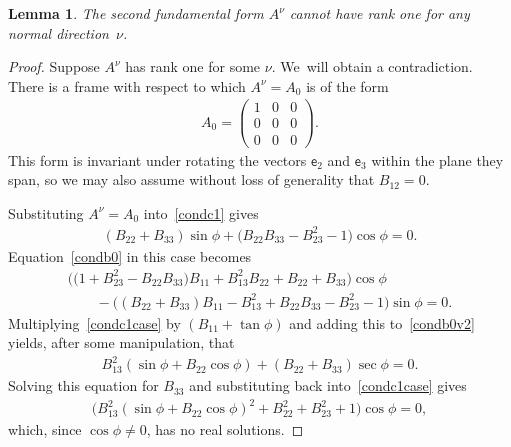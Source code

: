 \documentclass[10pt,a4paper]{amsart}
\def\ve{\mathsf{e}}
\newtheorem{Lemma}[Theorem]{Lemma}
\numberwithin{equation}{section}
\begin{document}
\begin{Lemma} \label{no-rank-one}
The second fundamental form $A^{\nu}$ cannot have rank one for any normal direc\-tion~$\nu$.
\end{Lemma}
\begin{proof}
Suppose $A^{\nu}$ has rank one for some $\nu$. We~will obtain a contradiction. There is a frame with respect to which $A^{\nu} = A_0$ is of the form
\begin{gather*}
A_0 = \begin{pmatrix} 1 & 0 & 0 \\ 0 & 0 & 0 \\ 0 & 0 & 0 \end{pmatrix}.
\end{gather*}
This form is invariant under rotating the vectors $\ve_2$ and $\ve_3$ within the plane they span, so we may also assume without loss of generality that $B_{12} = 0$.

Substituting $A^\nu = A_0$ into~\eqref{condc1} gives
\begin{gather} \label{condc1case}
(B_{22} + B_{33}) \sin\phi + \big(B_{22}B_{33}-B_{23}^2-1\big) \cos\phi = 0.
\end{gather}
Equation~\eqref{condb0} in this case becomes
\begin{gather}
\big( \big(1 + B_{23}^2 - B_{22}B_{33}\big) B_{11} + B_{13}^2 B_{22} + B_{22} + B_{33} \big) \cos \phi \nonumber
\\ \qquad
{} - \big( (B_{22} + B_{33}) B_{11} - B_{13}^2 + B_{22}B_{33} - B_{23}^2 - 1 \big) \sin \phi = 0.
 \label{condb0v2}\end{gather}
Multiplying~\eqref{condc1case} by $(B_{11} + \tan \phi)$ and adding this to~\eqref{condb0v2} yields, after some manipulation, that
\begin{gather*}
B_{13}^2 (\sin \phi + B_{22}\cos\phi) + (B_{22} + B_{33})\sec\phi = 0.
\end{gather*}
Solving this equation for $B_{33}$ and substituting back into~\eqref{condc1case} gives
\begin{gather*}
\big( B_{13}^2 (\sin \phi + B_{22}\cos\phi)^2 + B_{22}^2 + B_{23}^2 + 1\big) \cos\phi = 0,
\end{gather*}
which, since $\cos\phi \ne 0$, has no real solutions.
\end{proof}
\end{document}
